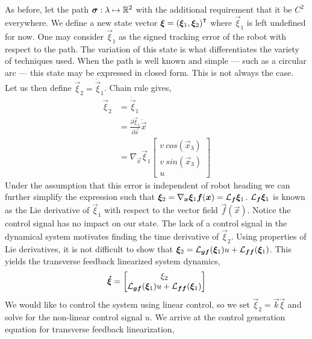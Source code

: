 \documentclass[oneside, 11pt]{book}
\begin{document}
As before, let the path $\bm{\sigma}:\lambda\mapsto\mathbb{R}^2$ with the additional requirement that it be $C^2$ everywhere. We define a new state vector $\bm{\xi}={(\bm{\xi}_1, \bm{\xi}_2)}^{\intercal}$ where $\vec{\xi}_1$ is left undefined for now. One may consider $\vec{\xi}_1$ as the signed tracking error of the robot with respect to the path. The variation of this state is what differentiates the variety of techniques used. When the path is well known and simple --- such as a circular arc --- this state may be expressed in closed form. This is not always the case. Let us then define $\vec{\xi}_2=\dot{\vec{\xi}}_1$. Chain rule gives,
\begin{align*}
    \vec{\xi}_2     &=  \dot{\vec{\xi}}_1\\
                    &=  \frac{\partial\vec{\xi}_1}{\partial\vec{x}}\dot{\vec{x}}\\
                    &=  \nabla_{\vec{x}}\vec{\xi}_1
                        \begin{bmatrix}
                            v~cos(\vec{x}_3)\\
                            v~sin(\vec{x}_3)\\
                            u
                        \end{bmatrix}
\end{align*}
Under the assumption that this error is independent of robot heading we can further simplify the expression such that $\bm{\xi}_2=\nabla_{\bm{x}}\bm{\xi}_1 \bm{f}(\bm{x}) = \mathcal{L}_{\bm{f}}\bm{\xi}_1$. $\mathcal{L}_{\bm{f}}\bm{\xi}_1$ is known as the Lie derivative of $\vec{\xi}_1$ with respect to the vector field $\vec{f}(\vec{x})$. Notice the control signal has no impact on our state. The lack of a control signal in the dynamical system motivates finding the time derivative of $\vec{\xi}_2$. Using properties of Lie derivatives, it is not difficult to show that $\bm{\xi}_2=\mathcal{L}_{\bm{g}\bm{f}}(\bm{\xi}_1) u + \mathcal{L}_{\bm{f}\bm{f}}(\bm{\xi}_1)$. This yields the transverse feedback linearized system dynamics,
\begin{equation}
    \bm{\dot{\xi}}
    =
    \begin{bmatrix} \xi_2 \\ \mathcal{L}_{\bm{g}\bm{f}}(\bm{\xi}_1) u + \mathcal{L}_{\bm{f}\bm{f}}(\bm{\xi}_1) \end{bmatrix}
    \label{eqn:tfl_dynamics}
\end{equation}
We would like to control the system using linear control, so we set $\vec{\xi}_2=\vec{k}\vec{\xi}$ and solve for the non-linear control signal $u$. We arrive at the control generation equation for transverse feedback linearization,
\end{document}
